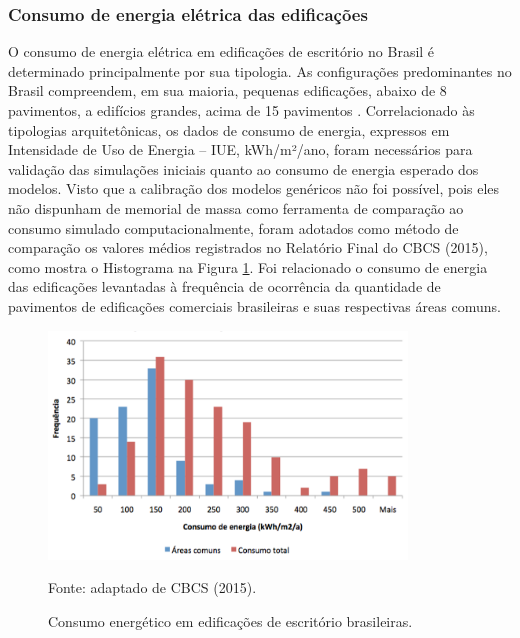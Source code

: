\subsubsection{Consumo de energia elétrica das edificações}
O consumo de energia elétrica em edificações de escritório no Brasil é determinado 
principalmente por sua tipologia. As configurações predominantes no Brasil compreendem, em 
sua maioria, pequenas edificações, abaixo de 8 pavimentos, a edifícios grandes, acima de 
15 pavimentos \cite{Carlo2008,Ramos2013,ConselhoBrasileirodeConstrucaoSustentavel-CBCS2015,Fonseca2016}.\vspace*{0.3cm} \newline
Correlacionado às tipologias arquitetônicas, os dados de consumo de energia, expressos em 
Intensidade de Uso de Energia – IUE, kWh/m²/ano, foram necessários para validação das 
simulações iniciais quanto ao consumo de energia esperado dos modelos. Visto que a calibração 
dos modelos genéricos não foi possível, pois eles não dispunham de memorial de massa como 
ferramenta de comparação ao consumo simulado computacionalmente, foram adotados como método 
de comparação os valores médios registrados no Relatório Final do CBCS (2015), como mostra o 
Histograma na Figura \ref{fig:figura9}. Foi relacionado o consumo de energia das edificações levantadas à 
frequência de ocorrência da quantidade de pavimentos de edificações comerciais brasileiras e 
suas respectivas áreas comuns.
\begin{figure}[ht]
    \centering
    \caption{\small Consumo energético em edificações de escritório brasileiras.}
    \includegraphics[width=0.85\textwidth]{figures/fig9_consumo-total-das-edificacoes-levantadas_cbcs_2015.png}
    \begin{flushleft}
        \par \small Fonte: adaptado de CBCS (2015).
    \end{flushleft}
    \label{fig:figura9}
 \end{figure}

